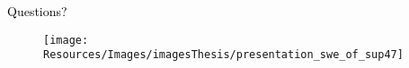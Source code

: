 \begin{frame}


\vspace{3cm}
\centering
\Huge \textcolor{black}{Questions?}\\[1cm]
\begin{figure}
     \texttt{[image: Resources/Images/imagesThesis/presentation\_swe\_of\_sup47]}
     \end{figure}
	
	
\end{frame}
\clearpage




